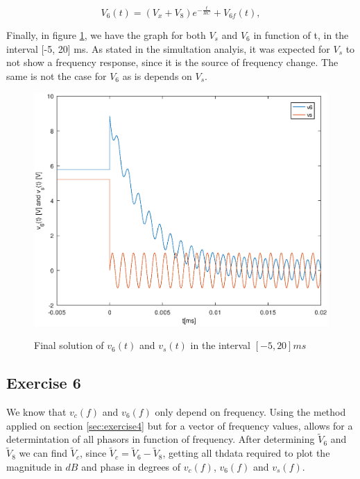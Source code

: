 \begin{equation}
  V_{6}(t) = (V_{x} + V_{8})e^{-\frac{t}{RC}} + V_{6f}(t),
  \label{eq:v6tot}
\end{equation}

Finally, in figure \ref{fig:theoretical_5}, we have the graph for both $V_s$ and $V_6$ in function of t, in the interval [-5, 20] ms. As stated in the simultation analyis, it was expected for $V_s$ to not show a frequency response, since it is the source of frequency change. The same is not the case for $V_6$ as is depends on $V_s$.

\begin{figure}[!ht] \centering
\caption{Final solution of $v_6(t)$ and $v_s(t)$ in the interval $[-5,20]ms$}
\includegraphics[width=0.8\linewidth]{theoretical_5.eps}
\label{fig:theoretical_5}
\end{figure}
\newpage 
\subsection{Exercise 6}
\label{sec:exercise6}
We know that $v_c(f)$ and $v_6(f)$ only depend on frequency. Using the method applied on section \ref{sec:exercise4} but for a vector of frequency values, allows for a determintation of all phasors in function of frequency. After determining  $\tilde{V}_6$ and  $\tilde{V}_8$ we can find  $\tilde{V}_c$, since  $\tilde{V}_c =  \tilde{V}_6 - \tilde{V}_8$, getting all thdata required to plot the magnitude in $dB$ and phase in degrees of $v_c(f)$, $v_6(f)$ and $v_s(f)$. 

